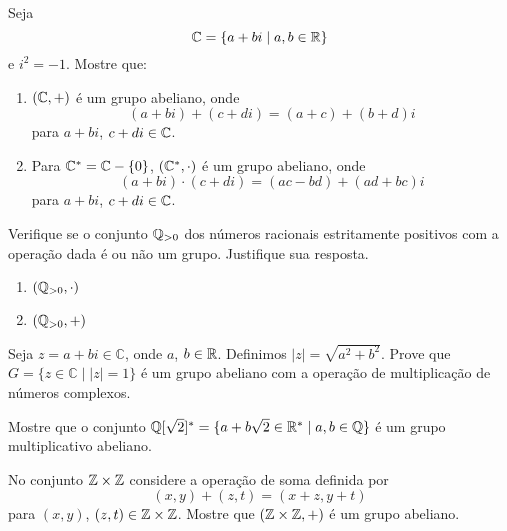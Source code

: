 \documentclass[12pt]{exam}
\begin{document}
    \vspace{.3cm}

    \questao{} Seja
    \[
    \mathbb{C} = \{a + bi \mid a, b \in \mathbb{R}\}
    \]
    e $i^2 = -1$. Mostre que:
    \begin{enumerate}[label=({\alph*})]
        \item $(\mathbb{C}, +)$ é um grupo abeliano, onde
        \[
        (a + bi) + (c + di) = (a + c) + (b + d)i
        \]
        para $a + bi$, $c + di \in \mathbb{C}$.
        \item Para $\mathbb{C}^* = \mathbb{C} - \{0\}$, $(\mathbb{C}^*, \cdot)$ é um grupo abeliano, onde
        \[
        (a + bi)\cdot (c + di) = (ac - bd) + (ad + bc)i
        \]
        para $a + bi$, $c + di \in \mathbb{C}$.
    \end{enumerate}

    \vspace{.3cm}

    \questao{} Verifique se o conjunto $\mathbb{Q}_{>0}$ dos números racionais estritamente positivos com a
    operação dada é ou não um grupo. Justifique sua
    resposta.
    \begin{multicols}{2}
        \begin{enumerate}[label=({\alph*})]
            \item $(\mathbb{Q}_{>0},\cdot)$

            \item $(\mathbb{Q}_{>0}, +)$
        \end{enumerate}
    \end{multicols}

    \vspace{.3cm}

    \questao{} Seja $z  = a + bi \in \mathbb{C}$, onde $a$, $b \in \mathbb{R}$. Definimos $|z| = \sqrt{a^2 + b^2}$. Prove que $G=\{z \in \mathbb{C} \mid |z| = 1\}$ é um grupo
    abeliano com a operação de multiplicação de números complexos.

    \vspace{.3cm}

    \questao{} Mostre que o conjunto $\mathbb{Q}[\sqrt{2}]^*=\{ a + b\sqrt{2} \in
    \mathbb{R}^* \mid  a, b \in \mathbb{Q} \}$ é um grupo multiplicativo abeliano.

    \vspace{.3cm}

    \questao{} No conjunto $\mathbb{Z} \times \mathbb{Z}$ considere a operação de soma definida por
    \[
    (x, y) + (z, t) = (x + z, y + t)
    \]
    para $(x, y)$, $(z, t) \in \mathbb{Z} \times \mathbb{Z}$. Mostre que $(\mathbb{Z}\times\mathbb{Z}, +)$ é um grupo abeliano.
\end{document}
